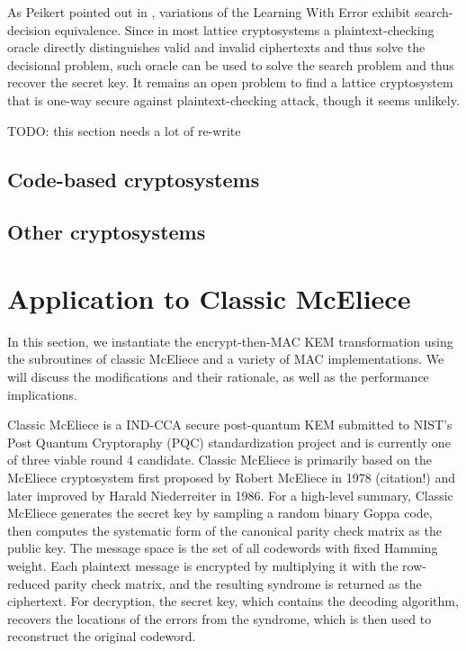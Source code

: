 \documentclass[runningheads]{llncs}
\begin{document}
As Peikert pointed out in \cite{DBLP:conf/pqcrypto/Peikert14}, variations of the Learning With Error exhibit search-decision equivalence. Since in most lattice cryptosystems a plaintext-checking oracle directly distinguishes valid and invalid ciphertexts and thus solve the decisional problem, such oracle can be used to solve the search problem and thus recover the secret key. It remains an open problem to find a lattice cryptosystem that is one-way secure against plaintext-checking attack, though it seems unlikely.

TODO: this section needs a lot of re-write

\subsection{Code-based cryptosystems}


\subsection{Other cryptosystems}

\section{Application to Classic McEliece}\label{sec:implementation-and-performance-analysis}
In this section, we instantiate the encrypt-then-MAC KEM transformation using the subroutines of classic McEliece and a variety of MAC implementations. We will discuss the modifications and their rationale, as well as the performance implications.

Classic McEliece is a IND-CCA secure post-quantum KEM submitted to NIST's Post Quantum Cryptoraphy (PQC) standardization project and is currently one of three viable round 4 candidate. Classic McEliece is primarily based on the McEliece cryptosystem first proposed by Robert McEliece in 1978 (citation!) and later improved by Harald Niederreiter in 1986. For a high-level summary, Classic McEliece generates the secret key by sampling a random binary Goppa code, then computes the systematic form of the canonical parity check matrix as the public key. The message space is the set of all codewords with fixed Hamming weight. Each plaintext message is encrypted by multiplying it with the row-reduced parity check matrix, and the resulting syndrome is returned as the ciphertext. For decryption, the secret key, which contains the decoding algorithm, recovers the locations of the errors from the syndrome, which is then used to reconstruct the original codeword.
\end{document}
